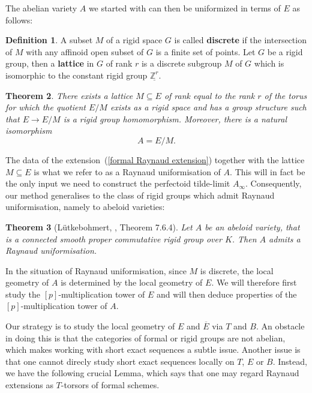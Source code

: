 \documentclass[10pt,oneside]{amsart}
\newtheorem{theorem}{Theorem}[section]
\theoremstyle{definition}
\newtheorem{definition}[theorem]{Definition}
\begin{document}
	The abelian variety $A$ we started with can then be uniformized in terms of $E$ as follows:
	
	\begin{definition}
		A subset $M$ of a rigid space $G$ is called \textbf{discrete} if the intersection of $M$ with any affinoid open subset of $G$ is a finite set of points.
		Let $G$ be a rigid group, then a \textbf{lattice} in $G$ of rank $r$ is a discrete subgroup $M$ of $G$ which is isomorphic to the constant rigid group $\underline{\mathbb Z^r}$. 
	\end{definition}
	
	\begin{theorem}\label{Raynaud uniformisation}
		There exists a lattice $M \subseteq E$ of rank equal to the rank $r$ of the torus for which the quotient $E/M$ exists as a rigid space and has a group structure such that $E\rightarrow E/M$ is a rigid group homomorphism. Moreover, there is a natural isomorphism
		\[A=E/M.\]
	\end{theorem}
	
	The data of the extension~(\ref{formal Raynaud extension}) together with the lattice $M\subseteq E$ is what we refer to as a Raynaud uniformisation of $A$. This will in fact be the only input we need to construct the perfectoid tilde-limit $A_\infty$. Consequently, our method generalises to the class of rigid groups which admit Raynaud uniformisation, namely to abeloid varieties:
	\begin{theorem}[L\"utkebohmert, \cite{Lut}, Theorem 7.6.4]\label{Raynaud uniformisation for abeloids}
		Let $A$ be an abeloid variety, that is a connected smooth proper commutative rigid group over $K$. Then $A$ admits a Raynaud uniformisation.
	\end{theorem}
	
	In the situation of Raynaud uniformisation, since $M$ is discrete, the local geometry of $A$ is determined by the local geometry of $E$. We will therefore first study the $[p]$-multiplication tower of $E$ and will then deduce properties of the $[p]$-multiplication tower of $A$.

	 Our strategy is to study the local geometry of $E$ and $\overline{E}$ via $T$ and $B$. An obstacle in doing this is that the categories of formal or rigid groups are not abelian, which makes working with short exact sequences a subtle issue. Another issue is that one cannot direcly study short exact sequences locally on $T$, $E$ or $B$. 
	Instead, we have the following crucial Lemma, which says that one may regard Raynaud extensions as $T$-torsors of formal schemes.
\end{document}
